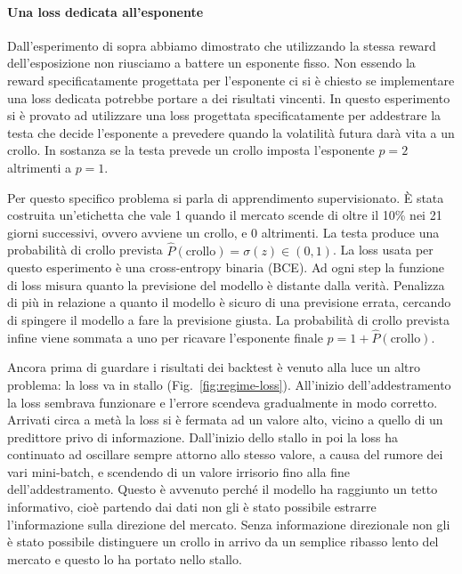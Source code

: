 \paragraph{Una loss dedicata all'esponente}

Dall'esperimento di sopra abbiamo dimostrato che utilizzando la stessa reward dell'esposizione non riusciamo a battere un esponente fisso.
Non essendo la reward specificatamente progettata per l'esponente ci si è chiesto se implementare una loss dedicata potrebbe portare a dei risultati vincenti.
In questo esperimento si è provato ad utilizzare una loss progettata specificatamente per addestrare la testa che decide l'esponente a prevedere quando la volatilità futura darà vita a un crollo.
In sostanza se la testa prevede un crollo imposta l'esponente $p=2$ altrimenti a $p=1$.

Per questo specifico problema si parla di apprendimento supervisionato.
È stata costruita un'etichetta che vale 1 quando il mercato scende di oltre il 10\% nei 21 giorni successivi, ovvero avviene un crollo, e 0 altrimenti.
La testa produce una probabilità di crollo prevista $\widehat{P}(\text{crollo})=\sigma(z)\in(0,1)$.
La loss usata per questo esperimento è una cross-entropy binaria (BCE).   
Ad ogni step la funzione di loss misura quanto la previsione del modello è distante dalla verità.
Penalizza di più in relazione a quanto il modello è sicuro di una previsione errata, cercando di spingere il modello a fare la previsione giusta.
La probabilità di crollo prevista infine viene sommata a uno per ricavare l'esponente finale $p = 1 + \widehat{P}(\text{crollo})$. 

Ancora prima di guardare i risultati dei backtest è venuto alla luce un altro problema: la loss va in stallo (Fig.~\ref{fig:regime-loss}).
All'inizio dell'addestramento la loss sembrava funzionare e l'errore scendeva gradualmente in modo corretto. 
Arrivati circa a metà la loss si è fermata ad un valore alto, vicino a quello di un predittore privo di informazione.
Dall'inizio dello stallo in poi la loss ha continuato ad oscillare sempre attorno allo stesso valore, a causa del rumore dei vari mini-batch, e scendendo di un valore irrisorio fino alla fine dell'addestramento.
Questo è avvenuto perché il modello ha raggiunto un tetto informativo, cioè partendo dai dati non gli è stato possibile estrarre l'informazione sulla direzione del mercato. 
Senza informazione direzionale non gli è stato possibile distinguere un crollo in arrivo da un semplice ribasso lento del mercato e questo lo ha portato nello stallo.

